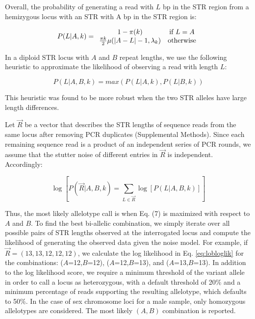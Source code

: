 Overall, the probability of generating a read with $L$ bp in the STR region from a hemizygous locus with an STR with A bp in the STR region is:

\begin{equation}
P(L|A, k) = 
\begin{array}{c c}
1-\pi(k) & \text{if } L=A \\
\frac{\pi{k}}{2} \mu(|A-L|-1, \lambda_k) & \text{otherwise} \\
\end{array}
\end{equation}

In a diploid STR locus with $A$ and $B$ repeat lengths, we use the following heuristic to approximate the likelihood of observing a read with length $L$:

\begin{equation}
P(L|A,B,k) = max(P(L|A,k),P(L|B,k))
\end{equation}

This heuristic was found to be more robust when the two STR alleles have large length differences.

Let $\vec{R}$ be a vector that describes the STR lengths of sequence reads from the same locus after removing PCR duplicates (Supplemental Methods). Since each remaining sequence read is a product of an independent series of PCR rounds, we assume that the stutter noise of different entries in $\vec{R}$ is independent. Accordingly: 

\begin{equation} \label{eq:lobloglik}
\log[P(\vec{R}|A,B,k) = \sum_{L\in \vec{R}}\log[P(L|A,B,k)]]
\end{equation}

Thus, the most likely allelotype call is when Eq. (7) is maximized with respect to $A$ and $B$. To find the best bi-allelic combination, we simply iterate over all possible pairs of STR lengths observed at the interrogated locus and compute the likelihood of generating the observed data given the noise model. For example, if $\vec{R}=(13,13,12,12,12)$, we calculate the log likelihood in Eq. \ref{eq:lobloglik} for the combinations: ($A$=12,$B$=12), ($A$=12,$B$=13), and ($A$=13,$B$=13). In addition to the log likelihood score, we require a minimum threshold of the variant allele in order to call a locus as heterozygous, with a default threshold of 20\% and a minimum percentage of reads supporting the resulting allelotype, which defaults to 50\%. In the case of sex chromosome loci for a male sample, only homozygous allelotypes are considered. The most likely $(A,B)$ combination is reported.

